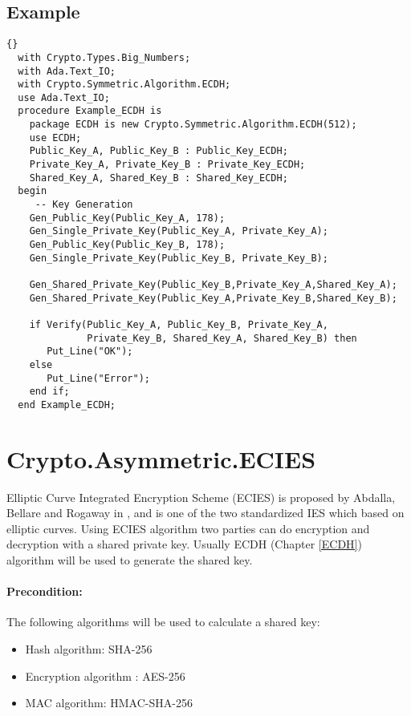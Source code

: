 \section{Example}
\begin{lstlisting}{}
  with Crypto.Types.Big_Numbers;
  with Ada.Text_IO;
  with Crypto.Symmetric.Algorithm.ECDH;
  use Ada.Text_IO;
  procedure Example_ECDH is
    package ECDH is new Crypto.Symmetric.Algorithm.ECDH(512);
    use ECDH;
    Public_Key_A, Public_Key_B : Public_Key_ECDH;
    Private_Key_A, Private_Key_B : Private_Key_ECDH;
    Shared_Key_A, Shared_Key_B : Shared_Key_ECDH;
  begin
     -- Key Generation
    Gen_Public_Key(Public_Key_A, 178);
    Gen_Single_Private_Key(Public_Key_A, Private_Key_A);
    Gen_Public_Key(Public_Key_B, 178);
    Gen_Single_Private_Key(Public_Key_B, Private_Key_B);

    Gen_Shared_Private_Key(Public_Key_B,Private_Key_A,Shared_Key_A);
    Gen_Shared_Private_Key(Public_Key_A,Private_Key_B,Shared_Key_B);
    
    if Verify(Public_Key_A, Public_Key_B, Private_Key_A, 
              Private_Key_B, Shared_Key_A, Shared_Key_B) then
       Put_Line("OK");
    else 
       Put_Line("Error");
    end if;
  end Example_ECDH;
\end{lstlisting}
\chapter{Crypto.Asymmetric.ECIES}
Elliptic Curve Integrated Encryption Scheme (ECIES) is proposed by Abdalla, Bellare and Rogaway in \cite{DBLP:conf/ctrsa/AbdallaBR01}, and is one of the two standardized IES which based on elliptic curves. Using ECIES algorithm two parties can do encryption and decryption with a shared private key. Usually ECDH (Chapter \ref{ECDH}) algorithm will be used to generate the shared key.
\subsubsection*{Precondition:}
The following algorithms will be used to calculate a shared key:
\begin{itemize}
\item Hash algorithm\quad\quad : SHA-256
\item Encryption algorithm : AES-256
\item MAC algorithm\quad\quad : HMAC-SHA-256
\end{itemize}
